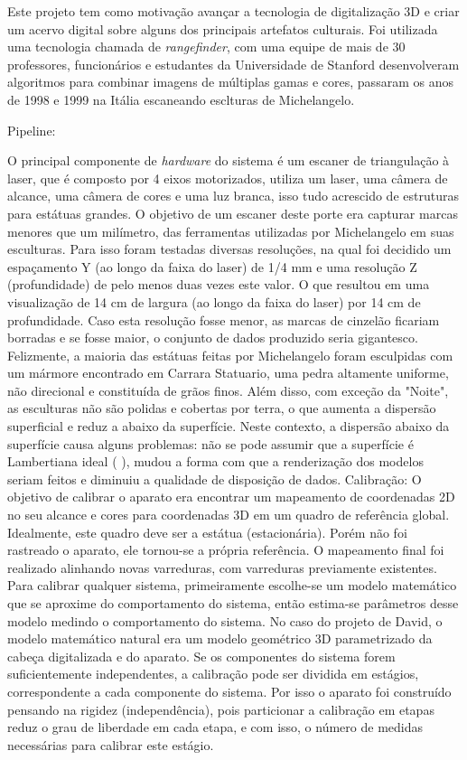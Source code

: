 Este projeto tem como motivação avançar a tecnologia de digitalização 3D e criar um acervo digital sobre alguns dos principais artefatos culturais. Foi utilizada uma tecnologia chamada de {\it rangefinder}, com uma equipe de mais de 30 professores, funcionários e estudantes da Universidade de Stanford desenvolveram algoritmos para combinar imagens de múltiplas gamas e cores, passaram os anos de 1998 e 1999 na Itália escaneando esclturas de Michelangelo. 

Pipeline:

O principal componente de {\it hardware} do sistema é um escaner de triangulação à laser, que é composto por 4 eixos motorizados, utiliza um laser, uma câmera de alcance, uma câmera de cores e uma luz branca, isso tudo acrescido de estruturas para estátuas grandes. O objetivo de um escaner deste porte era capturar marcas menores que um milímetro, das ferramentas utilizadas por Michelangelo em suas esculturas. 
Para isso foram testadas diversas resoluções, na qual foi decidido um espaçamento Y (ao longo da faixa do laser) de 1/4 mm e uma resolução Z (profundidade) de pelo menos duas vezes este valor. O que resultou em uma visualização de 14 cm de largura (ao longo da faixa do laser) por 14 cm de profundidade. Caso esta resolução fosse menor, as marcas de cinzelão ficariam borradas e se fosse maior, o conjunto de dados produzido seria gigantesco.
Felizmente, a maioria das estátuas feitas por Michelangelo foram esculpidas com um mármore encontrado em Carrara Statuario, uma pedra altamente uniforme, não direcional e constituída de grãos finos. Além disso, com exceção da "Noite", as esculturas não são polidas e cobertas por terra, o que aumenta a dispersão superficial e reduz a abaixo da superfície.
Neste contexto, a dispersão abaixo da superfície causa alguns problemas: não se pode assumir que a superfície é Lambertiana ideal (%
), mudou a forma com que a renderização dos modelos seriam feitos e diminuiu a qualidade de disposição de dados.
Calibração:
O objetivo de calibrar o aparato era encontrar um mapeamento de coordenadas 2D no seu alcance e cores para coordenadas 3D em um quadro de referência global. Idealmente, este quadro deve ser a estátua (estacionária). Porém não foi rastreado o aparato, ele tornou-se a própria referência. O mapeamento final foi realizado alinhando novas varreduras, com varreduras previamente existentes.
Para calibrar qualquer sistema, primeiramente escolhe-se um modelo matemático que se aproxime do comportamento do sistema, então estima-se parâmetros desse modelo medindo o comportamento do sistema. No caso do projeto de David, o modelo matemático natural era um modelo geométrico 3D parametrizado da cabeça digitalizada e do aparato. Se os componentes do sistema forem suficientemente independentes, a calibração pode ser dividida em estágios, correspondente a cada componente do sistema. Por isso o aparato foi construído pensando na rigidez (independência), pois particionar a calibração em etapas reduz o grau de liberdade em cada etapa, e com isso, o número de medidas necessárias para calibrar este estágio.
